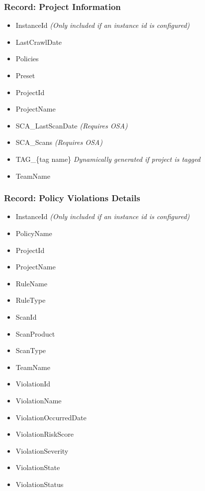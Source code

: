 \subsubsection{Record: Project Information}

\begin{itemize}
    \item InstanceId \textit{(Only included if an instance id is configured)}
    \item LastCrawlDate
    \item Policies
    \item Preset
    \item ProjectId
    \item ProjectName
    \item SCA\_LastScanDate \textit{(Requires OSA)}
    \item SCA\_Scans \textit{(Requires OSA)}
    \item TAG\_\{tag name\} \textit{Dynamically generated if project is tagged}
    \item TeamName
\end{itemize}



\subsubsection{Record: Policy Violations Details}
\begin{itemize}
    \item InstanceId \textit{(Only included if an instance id is configured)}
    \item PolicyName
    \item ProjectId
    \item ProjectName
    \item RuleName
    \item RuleType
    \item ScanId
    \item ScanProduct
    \item ScanType
    \item TeamName
    \item ViolationId
    \item ViolationName
    \item ViolationOccurredDate
    \item ViolationRiskScore
    \item ViolationSeverity
    \item ViolationState
    \item ViolationStatus
\end{itemize}


